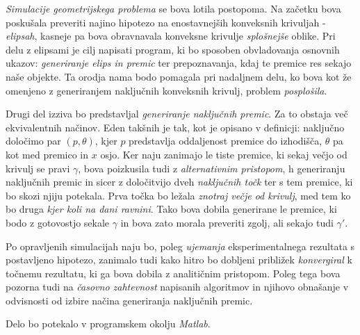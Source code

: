 \documentclass[a4paper]{article}
\begin{document}
\textit{Simulacije geometrijskega problema} se bova lotila postopoma. Na začetku bova poskušala preveriti najino hipotezo na enostavnejših konveksnih krivuljah - \textit{elipsah}, kasneje pa bova obravnavala konveksne krivulje \textit{splošnejše} oblike. Pri delu z elipsami je cilj napisati program, ki bo sposoben obvladovanja osnovnih ukazov: \textit{generiranje elips in premic} ter prepoznavanja, kdaj te premice res sekajo naše objekte. Ta orodja nama bodo pomagala pri nadaljnem delu, ko bova kot že omenjeno z generiranjem naključnih konveksnih krivulj, problem \textit{posplošila}.

Drugi del izziva bo predstavljal \textit{generiranje naključnih premic}. Za to obstaja več ekvivalentnih načinov. Eden takšnih je tak, kot je opisano v definicji: naključno določimo par $(p,\theta)$, kjer $p$ predstavlja oddaljenost premice do izhodišča, $\theta$ pa kot med premico in $x$ osjo. Ker naju zanimajo le tiste premice, ki sekaj večjo od krivulj se pravi $\gamma$, bova poizkusila tudi z \textit{alternativnim pristopom}, h generiranju naključnih premic in sicer z določitvijo dveh \textit{naključnih točk} ter s tem premice, ki bo skozi njiju potekala. Prva točka bo ležala \textit{znotraj večje od krivulj}, med tem ko bo druga \textit{kjer koli na dani ravnini}. Tako bova dobila generirane le premice, ki bodo z gotovostjo sekale $\gamma$ in bova zato morala preveriti zgolj, ali sekajo tudi $\gamma'$.

Po opravljenih simulacijah naju bo, poleg \textit{ujemanja} eksperimentalnega rezultata s postavljeno hipotezo, zanimalo tudi kako hitro bo dobljeni približek \textit{konvergiral} k točnemu  rezultatu, ki ga bova dobila z analitičnim pristopom. Poleg tega bova pozorna tudi na \textit{časovno zahtevnost} napisanih algoritmov in njihovo obnašanje v odvisnosti od izbire načina generiranja naključnih premic. 

Delo bo potekalo v programskem okolju \textit{Matlab}.

 
\end{document}
